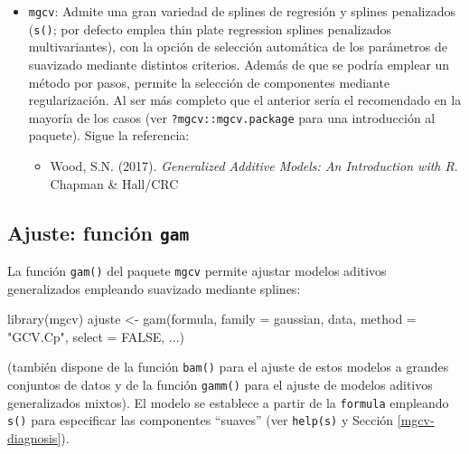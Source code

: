 \documentclass[
]{book}
\newenvironment{Shaded}{\begin{snugshade}}{\end{snugshade}}
\newcommand{\AttributeTok}[1]{\textcolor[rgb]{0.77,0.63,0.00}{#1}}
\newcommand{\ConstantTok}[1]{\textcolor[rgb]{0.00,0.00,0.00}{#1}}
\newcommand{\FunctionTok}[1]{\textcolor[rgb]{0.00,0.00,0.00}{#1}}
\newcommand{\NormalTok}[1]{#1}
\newcommand{\OtherTok}[1]{\textcolor[rgb]{0.56,0.35,0.01}{#1}}
\newcommand{\StringTok}[1]{\textcolor[rgb]{0.31,0.60,0.02}{#1}}
\providecommand{\tightlist}{%
  \setlength{\itemsep}{0pt}\setlength{\parskip}{0pt}}
\theoremstyle{break}
\theoremstyle{definition}
\theoremstyle{definition}
\theoremstyle{definition}
\theoremstyle{definition}
\theoremstyle{remark}
\begin{document}
\vspace{0.5cm}

\begin{itemize}
\item
  \texttt{mgcv}: Admite una gran variedad de splines de regresión y splines penalizados (\texttt{s()}; por defecto emplea thin plate regression splines penalizados multivariantes), con la opción de selección automática de los parámetros de suavizado mediante distintos criterios.
  Además de que se podría emplear un método por pasos, permite la selección de componentes mediante regularización.
  Al ser más completo que el anterior sería el recomendado en la mayoría de los casos (ver \texttt{?mgcv::mgcv.package} para una introducción al paquete).
  Sigue la referencia:

  \begin{itemize}
  \tightlist
  \item
    Wood, S.N. (2017). \emph{Generalized Additive Models: An Introduction with R}. Chapman \& Hall/CRC
  \end{itemize}
\end{itemize}

\vspace{0.5cm}

\hypertarget{ajuste-funciuxf3n-gam}{%
\subsection{\texorpdfstring{Ajuste: función \texttt{gam}}{Ajuste: función gam}}\label{ajuste-funciuxf3n-gam}}

La función \texttt{gam()} del paquete \texttt{mgcv} permite ajustar modelos aditivos generalizados empleando suavizado mediante splines:

\begin{Shaded}
\begin{Highlighting}[]
\FunctionTok{library}\NormalTok{(mgcv)}
\NormalTok{ajuste }\OtherTok{\textless{}{-}} \FunctionTok{gam}\NormalTok{(formula, }\AttributeTok{family =}\NormalTok{ gaussian, data, }\AttributeTok{method =} \StringTok{"GCV.Cp"}\NormalTok{, }\AttributeTok{select =} \ConstantTok{FALSE}\NormalTok{, ...)}
\end{Highlighting}
\end{Shaded}

(también dispone de la función \texttt{bam()} para el ajuste de estos modelos a grandes conjuntos de datos y de la función \texttt{gamm()} para el ajuste de modelos aditivos generalizados mixtos). El modelo se establece a partir de la \texttt{formula} empleando \texttt{s()} para especificar las componentes ``suaves'' (ver \texttt{help(s)} y Sección \ref{mgcv-diagnosis}).
\end{document}
